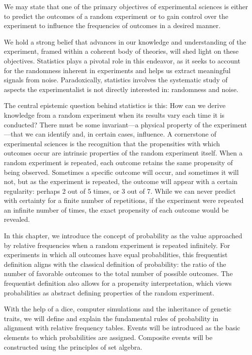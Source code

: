 \documentclass[
]{book}
\begin{document}
We may state that one of the primary objectives of experimental sciences is either to predict the outcomes of a random experiment or to gain control over the experiment to influence the frequencies of outcomes in a desired manner.

We hold a strong belief that advances in our knowledge and understanding of the experiment, framed within a coherent body of theories, will shed light on these objectives. Statistics plays a pivotal role in this endeavor, as it seeks to account for the randomness inherent in experiments and helps us extract meaningful signals from noise. Paradoxically, statistics involves the systematic study of aspects the experimentalist is not directly interested in: randomness and noise.

The central epistemic question behind statistics is this: How can we derive knowledge from a random experiment when its results vary each time it is conducted? There must be some invariant---a physical property of the experiment---that we can identify and, in certain cases, influence. A cornerstone of experimental sciences is the recognition that the propensities with which outcomes occur are intrinsic properties of the random experiment itself. When a random experiment is repeated, each outcome retains the same propensity of being observed. Sometimes a specific outcome will occur, and sometimes it will not, but as the experiment is repeated, the outcome will appear with a certain regularity: perhaps 2 out of 5 times, or 3 out of 7. While we can never predict with certainty for a finite number of repetitions, if the experiment were repeated an infinite number of times, the exact propensity of each outcome would be revealed.

In this chapter, we introduce the concept of probability as the value approached by relative frequencies when a random experiment is repeated infinitely. For experiments in which all outcomes have equal probabilities, this frequentist definition aligns with the classical definition of probability: the ratio of the number of favorable outcomes to the total number of possible outcomes. The frequentist definition also allows for a propensity interpretation, which views probabilities as abstract defining properties of the random experiment.

With the help of a dice, computer simulations and the inheritance of genetic traits, we will define and explain the fundamental rules of probability in alignment with relative frequency tables. Events will be introduced as the basic elements to which probabilities are assigned. Composite events will be constructed using the principles of set algebra.
\end{document}
